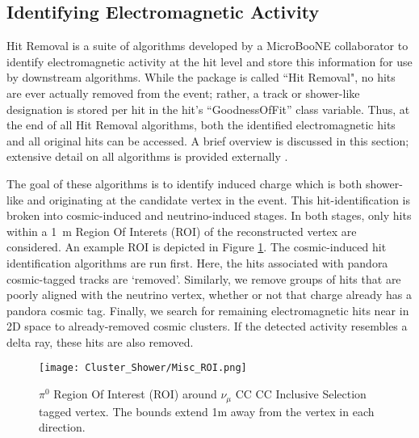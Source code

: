 \subsection{Identifying Electromagnetic Activity}

Hit Removal is a suite of algorithms developed by a MicroBooNE collaborator to identify electromagnetic activity at the hit level and store this information for use by downstream algorithms. While the package is called ``Hit Removal", no hits are ever actually removed from the event; rather, a track or shower-like designation is stored per hit in the hit's ``GoodnessOfFit'' class variable. Thus, at the end of all Hit Removal algorithms, both the identified electromagnetic hits and all original hits can be accessed. A brief overview is discussed in this section; extensive detail on all algorithms is provided externally \cite{bib:davidc_hitremoval}.

\par The goal of these algorithms is to identify induced charge which is both shower-like and originating at the candidate vertex in the event. This hit-identification is broken into cosmic-induced and neutrino-induced stages.  In both stages, only hits within a 1~m Region Of Interets (ROI) of the reconstructed vertex are considered. An example ROI is depicted in Figure \ref{fig:roi}. The cosmic-induced hit identification algorithms are run first.  Here, the hits associated with pandora cosmic-tagged tracks are `removed'.  Similarly, we remove groups of hits that are poorly aligned with the neutrino vertex, whether or not that charge already has a pandora cosmic tag. Finally, we search for remaining electromagnetic hits near in 2D space to already-removed cosmic clusters. If the detected activity resembles a delta ray, these hits are also removed. 

\begin{figure}[h!]
\centering
\texttt{[image: Cluster\_Shower/Misc\_ROI.png]}
\caption{$\pi^0$ Region Of Interest (ROI) around $\nu_\mu$ CC CC Inclusive Selection tagged  vertex. The bounds extend 1m away from the vertex in each direction. }
\label{fig:roi}
\end{figure}

